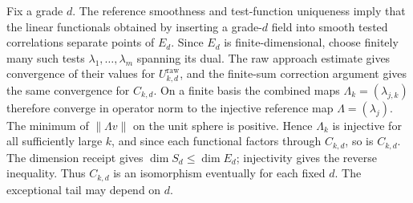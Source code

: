 Fix a grade $d$. The reference smoothness and test-function uniqueness imply
that the linear functionals obtained by inserting a grade-$d$ field into
smooth tested correlations separate points of $E_d$. Since $E_d$ is
finite-dimensional, choose finitely many such tests
$\lambda_1,\ldots,\lambda_m$ spanning its dual. The raw approach
estimate gives convergence of their values for $U^{\mathrm{raw}}_{k,d}$, and the finite-sum
correction argument gives the same convergence for $C_{k,d}$. On a finite
basis the combined maps $\Lambda_k=(\lambda_{j,k})$ therefore converge in
operator norm to the injective reference map $\Lambda=(\lambda_j)$. The
minimum of $\|\Lambda v\|$ on the unit sphere is positive. Hence
$\Lambda_k$ is injective for all sufficiently large $k$, and since each
functional factors through $C_{k,d}$, so is $C_{k,d}$. The dimension receipt
gives $\dim S_d\le\dim E_d$; injectivity gives the reverse inequality.
Thus $C_{k,d}$ is an isomorphism eventually for each fixed $d$. The
exceptional tail may depend on $d$.


